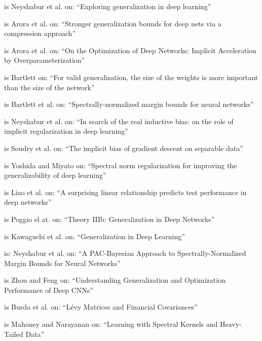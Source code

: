 \cite{NBMS17_TR} is 
Neyshabur et al. on:
``Exploring generalization in deep learning''

\cite{AGNZ18_TR} is 
Arora et al. on:
``Stronger generalization bounds for deep nets via a compression approach''

\cite{ACH18_TR} is 
Arora et al. on:
``On the Optimization of Deep Networks: Implicit Acceleration by Overparameterization''

\cite{Bar97} is
Bartlett on:
``For valid generalization, the size of the weights is more important than the size of the network''

\cite{BFT17_TR} is 
Bartlett et al. on:
``Spectrally-normalized margin bounds for neural networks''

\cite{NTS14_TR} is
Neyshabur et al. on: 
``In search of the real inductive bias: on the role of implicit regularization in deep learning''

\cite{SHNx17_TR} is 
Soudry et al. on: 
``The implicit bias of gradient descent on separable data''

\cite{YM17_TR} is 
Yoshida and Miyato on:
``Spectral norm regularization for improving the generalizability of deep learning''

\cite{LMBx18_TR} is 
Liao et al. on:
``A surprising linear relationship predicts test performance in deep networks''

\cite{PLMx18_TR}
is Poggio el at. on: 
``Theory {IIIb}: Generalization in Deep Networks''

\cite{KKB17_TR} is 
Kawaguchi et al. on:
``Generalization in Deep Learning''

\cite{NBS17_TR} is:
Neyshabur et al. on: 
``A {PAC}-{B}ayesian Approach to Spectrally-Normalized Margin Bounds for Neural Networks''

\cite{ZF18_TR} is
Zhou and Feng on:
``Understanding Generalization and Optimization Performance of Deep {CNN}s''

\cite{BJNx01_TR} is
Burda et al. on:
``{L}{\'e}vy Matrices and Financial Covariances''

\cite{MN09_TR} is
Mahoney and Narayanan on:
``Learning with Spectral Kernels and Heavy-Tailed Data''


